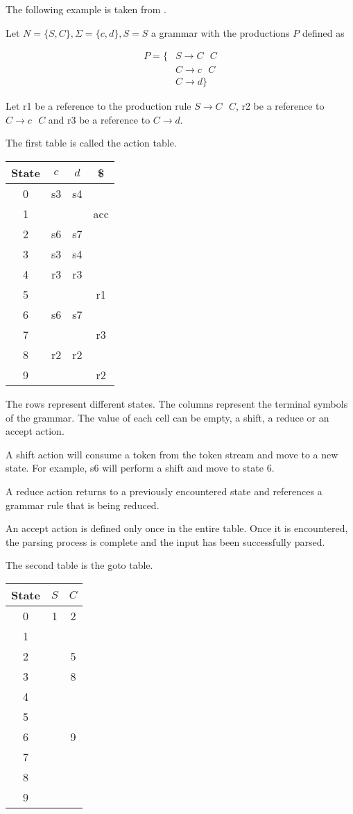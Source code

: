 The following example is taken from \cite{AhoLSU2006}.

Let $N = \{S, C\}, \Sigma = \{c, d\}, S = S$ a grammar with the productions $P$ defined as

\begin{align}
P = \{&S \rightarrow C\text{ }C\\
&C \rightarrow c\text{ }C\\
&C \rightarrow d\}
\end{align}

Let r1 be a reference to the production rule $S \rightarrow C\text{ }C$, r2 be a reference to $C \rightarrow c\text{ }C$ and r3 be a reference to $C \rightarrow d$.

The first table is called the action table.

\begin{center}
\begin{tabular}{c|ccc}
State & $c$ & $d$ & \$\\
\hline 
0 & s3 & s4 & \\
1 &    &    & acc \\
2 & s6 & s7 & \\
3 & s3 & s4 & \\
4 & r3 & r3 & \\
5 & & & r1\\
6 & s6 & s7 & \\
7 & & & r3\\
8 & r2 & r2 & \\
9 & & & r2
\end{tabular} 
\end{center}


The rows represent different states. 
The columns represent the terminal symbols of the grammar. 
The value of each cell can be empty, a shift, a reduce or an accept action.  

A shift action will consume a token from the token stream and move to a new state. 
For example, s6 will perform a shift and move to state 6.

A reduce action returns to a previously encountered state and references a grammar rule that is being reduced.

An accept action is defined only once in the entire table. Once it is encountered, the parsing process is complete and the input has been successfully parsed.

The second table is the goto table. 

\begin{center}
\begin{tabular}{c|cc}
State & $S$ & $C$\\
\hline 
0 & 1 & 2\\
1 &    &     \\
2 &  & 5 \\
3 &  & 8  \\
4 &  &   \\
5 &  & \\
6 &  & 9 \\
7 &  & \\
8 &  &  \\
9 &  & 
\end{tabular} 
\end{center}

